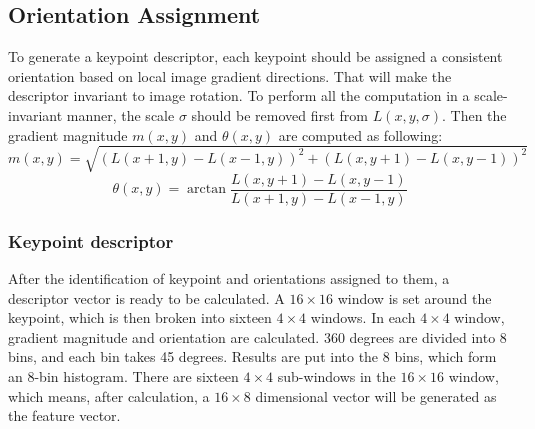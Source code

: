 \subsection{Orientation Assignment}
To generate a keypoint descriptor, each keypoint should be assigned a consistent orientation based on local image gradient directions. 
That will make the descriptor invariant to image rotation.
To perform all the computation in a scale-invariant manner, the scale $\sigma$ should be removed first from $L(x, y, \sigma)$.
Then the gradient magnitude $m(x, y)$ and $\theta(x, y)$ are computed as following:
$$
m(x, y) = \sqrt{(L(x+1, y) - L(x-1, y))^2 + (L(x, y+1) - L(x, y-1))^2}
$$
$$
\theta(x, y) = \arctan \frac{L(x, y+1) - L(x, y-1)}{L(x+1, y) - L(x- 1,y)}
$$

\subsubsection{Keypoint descriptor}
After the identification of keypoint and orientations assigned to them, a descriptor vector is ready to be calculated. 
A $16 \times 16$ window is set around the keypoint, which is then broken into sixteen $4 \times 4$ windows. 
In each $4 \times 4$ window, gradient magnitude and orientation are calculated. 360 degrees are divided into 8 bins, and each bin takes 45 degrees.
Results are put into the 8 bins, which form an 8-bin histogram.
There are sixteen $ 4 \times 4 $ sub-windows in the $16 \times 16$ window, which means, after calculation, a $16 \times 8$ dimensional vector will be generated as the feature vector.